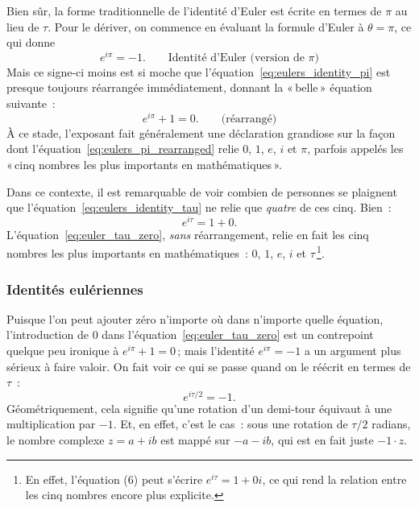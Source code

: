 Bien sûr, la forme traditionnelle de l'identité d'Euler est écrite en termes de
$\pi$ au lieu de $\tau$. Pour le dériver, on commence en évaluant la formule
d'Euler à $\theta = \pi$, ce qui donne
\begin{equation}
\label{eq:eulers_identity_pi}
e^{i\pi} = -1. \qquad\mbox{Identité d'Euler (version de $\pi$)}
\end{equation}
\noindent Mais ce signe-ci moins est si moche que
l'équation~\eqref{eq:eulers_identity_pi} est presque toujours réarrangée
immédiatement, donnant la «\,belle\,» équation suivante~:
\begin{equation}
\label{eq:eulers_pi_rearranged}
e^{i\pi} + 1 = 0. \qquad\mbox{(réarrangé)}
\end{equation}
À ce stade, l'exposant fait généralement une déclaration grandiose sur la façon
dont l'équation~\eqref{eq:eulers_pi_rearranged} relie $0$, $1$, $e$, $i$ et
$\pi$, parfois appelés les «\,cinq nombres les plus importants en
mathématiques\,».

Dans ce contexte, il est remarquable de voir combien de personnes se plaignent
que l'équation~\eqref{eq:eulers_identity_tau} ne relie que \emph{quatre} de ces
cinq. Bien~:
\begin{equation}
\label{eq:euler_tau_zero}
e^{i\tau} = 1 + 0.
\end{equation}
L'équation~\eqref{eq:euler_tau_zero}, \emph{sans} réarrangement, relie en fait
les cinq nombres les plus importants en mathématiques~: $0$, $1$, $e$, $i$ et
$\tau$\,\footnote{En effet, l'équation (6) peut s'écrire $e^{i\tau} = 1 + 0i$,
ce qui rend la relation entre les cinq nombres encore plus explicite.}.

      \subsubsection{Identités eulériennes} %
      \label{sec:eulerian_identities}

Puisque l'on peut ajouter zéro n'importe où dans n'importe quelle équation,
l'introduction de $0$ dans l'équation~\eqref{eq:euler_tau_zero} est un
contrepoint quelque peu ironique à $e^{i\pi} + 1 = 0$\,; mais l'identité
$e^{i\pi} = -1$ a un argument plus sérieux à faire valoir. On fait voir ce qui
se passe quand on le réécrit en termes de $\tau$~:
\[
e^{i\tau /2} = -1.
\]
Géométriquement, cela signifie qu'une rotation d'un demi-tour équivaut à une
multiplication par $-1$. Et, en effet, c'est le cas~: sous une rotation de
$\tau/2$ radians, le nombre complexe $z = a + ib$ est mappé sur $-a - ib$, qui
est en fait juste $-1\cdot z$.

